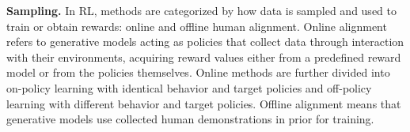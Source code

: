 



\noindent \textbf{Sampling.} In RL, methods are categorized by how data is sampled and used to train or obtain rewards: online and offline human alignment. Online alignment refers to generative models acting as policies that collect data through interaction with their environments, acquiring reward values either from a predefined reward model or from the policies themselves. Online methods are further divided into on-policy learning with identical behavior and target policies and off-policy learning with different behavior and target policies. Offline alignment means that generative models use collected human demonstrations in prior for training.


